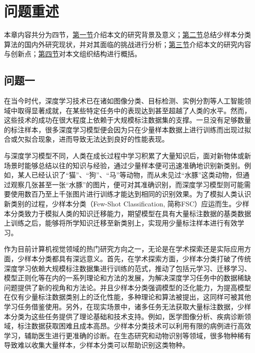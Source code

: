 \chapter[\hspace{0pt}问题重述]{{\heiti{}\hspace{0pt}问题重述}}\label{chapter: 问题重述}

本章内容共分为四节，\hyperref[section1: 问题一]{第一节}介绍本文的研究背景及意义；\hyperref[section1: 问题二]{第二节}总结少样本分类算法的国内外研究现状，并对其面临的挑战进行分析；\hyperref[section1: 问题三]{第三节}介绍本文的研究内容与创新点；\hyperref[section1: 本文组织结构]{第四节}对本文组织结构进行概括。

\section[\hspace{-2pt}问题一]{{\heiti{} \hspace{-8pt}问题一}}\label{section1: 问题一}

在当今时代，深度学习技术已在诸如图像分类、目标检测、实例分割等人工智能领域中取得显著成就\cite{krizhevsky2012imagenet, yolo, FasterRcnn, MaskRcnn, 图像分类, 陈科圻2020多尺度目标检测的深度学习研究综述, 蒋弘毅2021目标检测模型及其优化方法综述, 语义分割}，在某些特定任务中的表现达到甚至超越了人类的水平。然而，这些技术的成功在很大程度上依赖于大规模标注数据集的支撑。一旦没有足够数量的标注样本，很多深度学习模型便会因为只在少量样本数据上进行训练而出现过拟合或欠拟合现象，进而导致无法达到良好的性能表现。

与深度学习模型不同，人类在成长过程中学习积累了大量知识后，面对新物体或新场景时能够总结以往的知识与经验，通过少量样本便可迅速准确地识别新类别。例如，某人已经认识了“猫”、“狗”、“马”等动物，而从未见过“水豚”这类动物，但通过观察几张甚至一张“水豚”的图片，便可对其准确识别，而深度学习模型则可能需要使用数百乃至上千张图片进行训练才能达到相同的识别效果。为了模拟人类认识新类别的过程，少样本分类（Few-Shot Classification, 简称FSC）应运而生。少样本分类致力于模拟人类的知识迁移能力，期望模型在具有大量标注数据的基类数据上训练之后，能够将所学知识迁移至新类别上，实现用少量标注样本进行有效学习。

作为目前计算机视觉领域的热门研究方向之一，无论是在学术探索还是实际应用方面，少样本分类都具有深远意义。首先，在学术探索方面，少样本分类打破了传统深度学习依赖大规模标注数据集进行训练的范式，推动了包括元学习、迁移学习、模型正则化等在内的一系列理论和方法的发展，为解决深度学习任务中的数据稀缺问题提供了新的视角和方法论。并且少样本分类强调模型的泛化能力，为提高模型在仅有少量标注数据类别上的泛化性能，多种理论和算法被提出，这同样可被其他学习任务借鉴使用。另外，在现实场景中，诸多任务无法获取大量标注数据，少样本分类为这些任务提供了理论基础和技术支持。例如，医学图像分析、疾病诊断领域，标注数据获取困难且成本高昂。少样本分类技术可以利用有限的病例进行高效学习，辅助医生进行更准确的诊断。在生态研究和动物识别等领域，很多物种稀有导致难以收集大量样本，少样本分类可以帮助识别这类物种。

